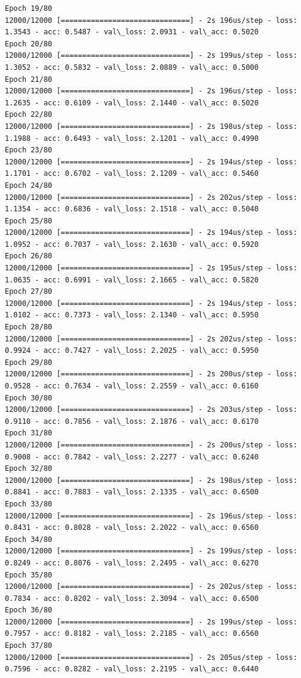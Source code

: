 \documentclass[11pt]{article}
\begin{document}
\begin{Verbatim}[commandchars=\\\{\}]
Epoch 19/80
12000/12000 [==============================] - 2s 196us/step - loss: 1.3543 - acc: 0.5487 - val\_loss: 2.0931 - val\_acc: 0.5020
Epoch 20/80
12000/12000 [==============================] - 2s 199us/step - loss: 1.3052 - acc: 0.5832 - val\_loss: 2.0889 - val\_acc: 0.5000
Epoch 21/80
12000/12000 [==============================] - 2s 196us/step - loss: 1.2635 - acc: 0.6109 - val\_loss: 2.1440 - val\_acc: 0.5020
Epoch 22/80
12000/12000 [==============================] - 2s 198us/step - loss: 1.1988 - acc: 0.6493 - val\_loss: 2.1201 - val\_acc: 0.4990
Epoch 23/80
12000/12000 [==============================] - 2s 194us/step - loss: 1.1701 - acc: 0.6702 - val\_loss: 2.1209 - val\_acc: 0.5460
Epoch 24/80
12000/12000 [==============================] - 2s 202us/step - loss: 1.1354 - acc: 0.6836 - val\_loss: 2.1518 - val\_acc: 0.5040
Epoch 25/80
12000/12000 [==============================] - 2s 194us/step - loss: 1.0952 - acc: 0.7037 - val\_loss: 2.1630 - val\_acc: 0.5920
Epoch 26/80
12000/12000 [==============================] - 2s 195us/step - loss: 1.0635 - acc: 0.6991 - val\_loss: 2.1665 - val\_acc: 0.5820
Epoch 27/80
12000/12000 [==============================] - 2s 194us/step - loss: 1.0102 - acc: 0.7373 - val\_loss: 2.1340 - val\_acc: 0.5950
Epoch 28/80
12000/12000 [==============================] - 2s 202us/step - loss: 0.9924 - acc: 0.7427 - val\_loss: 2.2025 - val\_acc: 0.5950
Epoch 29/80
12000/12000 [==============================] - 2s 200us/step - loss: 0.9528 - acc: 0.7634 - val\_loss: 2.2559 - val\_acc: 0.6160
Epoch 30/80
12000/12000 [==============================] - 2s 203us/step - loss: 0.9110 - acc: 0.7856 - val\_loss: 2.1876 - val\_acc: 0.6170
Epoch 31/80
12000/12000 [==============================] - 2s 200us/step - loss: 0.9008 - acc: 0.7842 - val\_loss: 2.2277 - val\_acc: 0.6240
Epoch 32/80
12000/12000 [==============================] - 2s 198us/step - loss: 0.8841 - acc: 0.7883 - val\_loss: 2.1335 - val\_acc: 0.6500
Epoch 33/80
12000/12000 [==============================] - 2s 196us/step - loss: 0.8431 - acc: 0.8028 - val\_loss: 2.2022 - val\_acc: 0.6560
Epoch 34/80
12000/12000 [==============================] - 2s 199us/step - loss: 0.8249 - acc: 0.8076 - val\_loss: 2.2495 - val\_acc: 0.6270
Epoch 35/80
12000/12000 [==============================] - 2s 202us/step - loss: 0.7834 - acc: 0.8202 - val\_loss: 2.3094 - val\_acc: 0.6500
Epoch 36/80
12000/12000 [==============================] - 2s 199us/step - loss: 0.7957 - acc: 0.8182 - val\_loss: 2.2185 - val\_acc: 0.6560
Epoch 37/80
12000/12000 [==============================] - 2s 205us/step - loss: 0.7596 - acc: 0.8282 - val\_loss: 2.2195 - val\_acc: 0.6440

\end{Verbatim}
\end{document}
